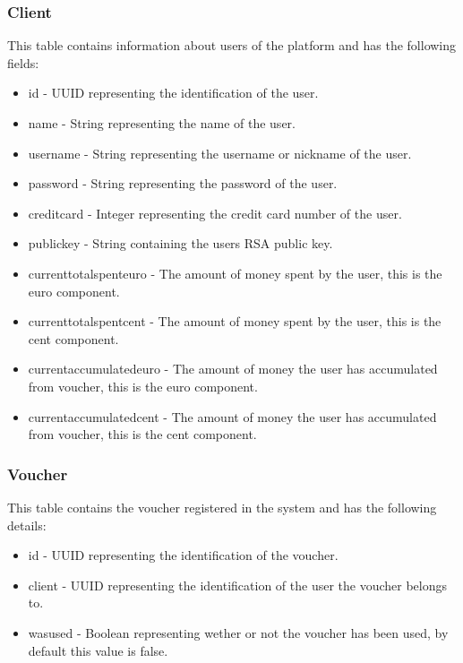 \documentclass[12pt]{article}
\begin{document}
\subsubsection{Client}
\hspace{0.6cm}
This table contains information about users of the platform and has the following fields:
\begin{itemize}
    \item id - UUID representing the identification of the user.
    \item name - String representing the name of the user.
    \item username - String representing the username or nickname of the user.
    \item password - String representing the password of the user.
    \item credit\textunderscore card - Integer representing the credit card number of the user.
    \item public\textunderscore key - String containing the users RSA public key.
    \item current\textunderscore total\textunderscore spent\textunderscore euro - The amount of money spent by the user, this is the euro component.
    \item current\textunderscore total\textunderscore spent\textunderscore cent - The amount of money spent by the user, this is the cent component.
    \item current\textunderscore accumulated\textunderscore euro - The amount of money the user has accumulated from voucher, this is the euro component.
    \item current\textunderscore accumulated\textunderscore cent - The amount of money the user has accumulated from voucher, this is the cent component.
\end{itemize}


\subsubsection{Voucher}
\hspace{0.6cm}
This table contains the voucher registered in the system and has the following details:
\begin{itemize}
    \item id - UUID representing the identification of the voucher.
	\item client - UUID representing the identification of the user the voucher belongs to.
	\item was\textunderscore used - Boolean representing wether or not the voucher has been used, by default this value is false.
\end{itemize}
\end{document}
